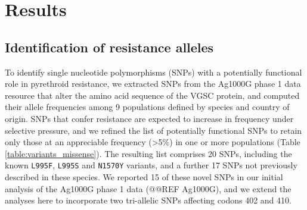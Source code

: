 \documentclass[a4paper,11pt,abstracton]{scrartcl}
\begin{document}
\section*{Results}


\subsection*{Identification of resistance alleles}


To identify single nucleotide polymorphisms (SNPs) with a potentially functional role in pyrethroid resistance, we extracted SNPs from the Ag1000G phase 1 data resource that alter the amino acid sequence of the VGSC protein, and computed their allele frequencies among 9 populations defined by species and country of origin.
%
SNPs that confer resistance are expected to increase in frequency under selective pressure, and we refined the list of potentially functional SNPs to retain only those at an appreciable frequency (>5\%) in one or more populations (Table \ref{table:variants_missense}).
%
The resulting list comprises 20 SNPs, including the known \texttt{L995F}, \texttt{L995S} and \texttt{N1570Y} variants, and a further 17 SNPs not previously described in these species.
%
We reported 15 of these novel SNPs in our initial analysis of the Ag1000G phase 1 data (@@REF Ag1000G), and we extend the analyses here to incorporate two tri-allelic SNPs affecting codons 402 and 410.
\end{document}
